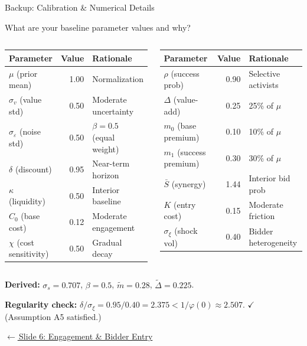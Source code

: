 \documentclass[aspectratio=169,10pt]{beamer}
\newcommand{\1}{\mathbf{1}}
\newcommand{\returnlink}[2]{%
  \par\vspace{0.2em}\hfill{\scriptsize\hyperlink{#1}{\textcolor{brightblue}{$\leftarrow$\,#2}}}%
}
\begin{document}
\begin{frame}[standout]
Backup: Calibration \& Numerical Details
\end{frame}

\begin{frame}{What are your baseline parameter values and why?}
\hypertarget{backup:calibration}{}
\scriptsize
\begin{columns}[T,onlytextwidth]
\begin{tabular}{@{}lrl@{}}
\toprule
\textbf{Parameter} & \textbf{Value} & \textbf{Rationale} \\
\midrule
$\mu$ (prior mean) & 1.00 & Normalization \\
$\sigma_v$ (value std) & 0.50 & Moderate uncertainty \\
$\sigma_\varepsilon$ (noise std) & 0.50 & $\beta = 0.5$ (equal weight) \\
$\delta$ (discount) & 0.95 & Near-term horizon \\
$\kappa$ (liquidity) & 0.50 & Interior baseline \\
$C_0$ (base cost) & 0.12 & Moderate engagement \\
$\chi$ (cost sensitivity) & 0.50 & Gradual decay \\
\bottomrule
\end{tabular}

\begin{tabular}{@{}lrl@{}}
\toprule
\textbf{Parameter} & \textbf{Value} & \textbf{Rationale} \\
\midrule
$\rho$ (success prob) & 0.90 & Selective activists \\
$\Delta$ (value-add) & 0.25 & 25\% of $\mu$ \\
$m_0$ (base premium) & 0.10 & 10\% of $\mu$ \\
$m_1$ (success premium) & 0.30 & 30\% of $\mu$ \\
$\bar{S}$ (synergy) & 1.44 & Interior bid prob \\
$K$ (entry cost) & 0.15 & Moderate friction \\
$\sigma_\xi$ (shock vol) & 0.40 & Bidder heterogeneity \\
\bottomrule
\end{tabular}
\end{columns}

\vspace{0.3em}

\textbf{Derived:} $\sigma_s = 0.707$, $\beta = 0.5$, $\tilde{m} = 0.28$, $\tilde{\Delta} = 0.225$.

\vspace{0.2em}

\textbf{Regularity check:} $\delta/\sigma_\xi = 0.95/0.40 = 2.375 < 1/\varphi(0) \approx 2.507$. $\checkmark$ (Assumption A5 satisfied.)

\returnlink{main:engagement}{Slide 6: Engagement \& Bidder Entry}
\end{frame}
\end{document}
